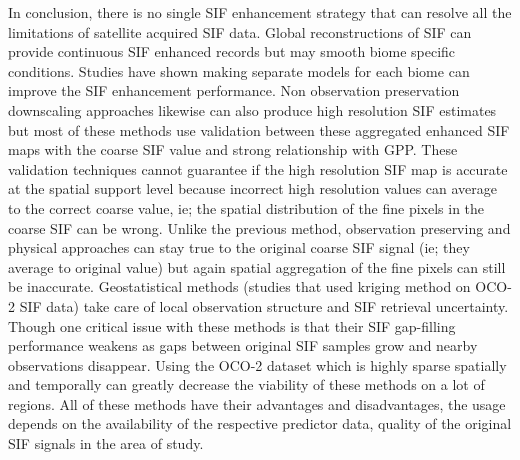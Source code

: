 In conclusion, there is no single SIF enhancement strategy that can resolve all the limitations of satellite acquired SIF data. Global reconstructions of SIF can provide continuous SIF enhanced records but may smooth biome specific conditions. Studies have shown making separate models for each biome can improve the SIF enhancement performance. Non observation preservation downscaling approaches likewise can also produce high resolution SIF estimates but most of these methods use validation between these aggregated enhanced SIF maps with the coarse SIF value and strong relationship with GPP. These validation techniques cannot guarantee if the high resolution SIF map is accurate at the spatial support level because incorrect high resolution values can average to the correct coarse value, ie; the spatial distribution of the fine pixels in the coarse SIF can be wrong. Unlike the previous method, observation preserving and physical approaches can stay true to the original coarse SIF signal (ie; they average to original value) but again spatial aggregation of the fine pixels can still be inaccurate. Geostatistical methods (studies that used kriging method on OCO-2 SIF data) take care of local observation structure and SIF retrieval uncertainty. Though one critical issue with these methods is that their SIF gap-filling performance weakens as gaps between original SIF samples grow and nearby observations disappear. Using the OCO-2 dataset which is highly sparse spatially and temporally can greatly decrease  the viability of these methods on a lot of regions. All of these methods have their advantages and disadvantages, the usage depends on the availability of the respective predictor data, quality of the original SIF signals in the area of study.


\begingroup
\tiny
\setlength{\tabcolsep}{1pt}
\renewcommand{\arraystretch}{1.10}

